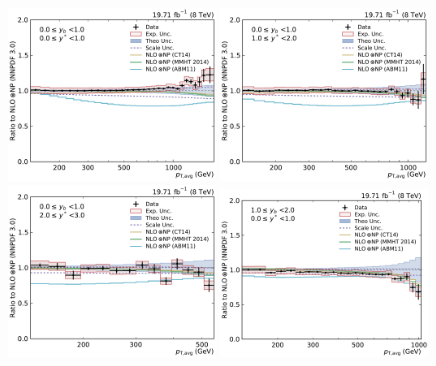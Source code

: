 \begin{figure}[htbp]
    \centering
    \includegraphics[width=0.49\textwidth]{figures/measurement/ratio_to_NNPDF30+np_totcomp_yb0ys0.pdf}\hfill
    \includegraphics[width=0.49\textwidth]{figures/measurement/ratio_to_NNPDF30+np_totcomp_yb0ys1.pdf}
    \includegraphics[width=0.49\textwidth]{figures/measurement/ratio_to_NNPDF30+np_totcomp_yb0ys2.pdf}\hfill
    \includegraphics[width=0.49\textwidth]{figures/measurement/ratio_to_NNPDF30+np_totcomp_yb1ys0.pdf}

\end{figure}
